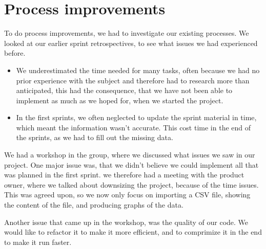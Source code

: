 \section{Process improvements} %
\label{sec:improvements}
To do process improvements, we had to investigate our existing processes. We looked at our earlier sprint retrospectives, to see what issues we had experienced before. 
\begin{itemize}
	\item We underestimated the time needed for many tasks, often because we had no prior experience with the subject and therefore had to research more than anticipated, this had the consequence, that we have not been able to implement as much as we hoped for, when we started the project.
	\item In the first sprints, we often neglected to update the sprint material in time, which meant the information wasn't accurate. This cost time in the end of the sprints, as we had to fill out the missing data.
\end{itemize}

We had a workshop in the group, where we discussed what issues we saw in our project. One major issue was, that we didn't believe we could implement all that was planned in the first sprint.
we therefore had a meeting with the product owner, where we talked about downsizing the project, because of the time issues. This was agreed upon, so we now only focus on importing a CSV file, showing the content of the file, and producing graphs of the data.

Another issue that came up in the workshop, was the quality of our code. We would like to refactor it to make it more efficient, and to comprimize it in the end to make it run faster.

